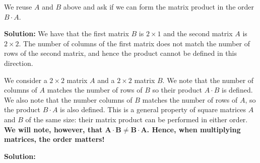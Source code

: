 \begin{example}
\label{ex:MatrixMultiplication02} 
 We reuse $A$ and $B$ above and ask if we can form the matrix product in the order $B \cdot A$.
\end{example}

\textbf{Solution:}
 We have that the first matrix $B$ is $2 \times 1$ and the second matrix $A$ is $2 \times 2$. The number of columns of the first matrix does not match the number of rows of the second matrix, and hence the product cannot be defined in this direction. \Qed\\

\begin{example}
\label{ex:MatrixMultiplication03} 
 We consider a $2 \times 2$ matrix $A$ and a $2 \times 2$ matrix $B$. We note that the number of columns of $A$ matches the number of rows of $B$ so their product $A\cdot B$ is defined. We also note that the number columns of $B$ matches the number of rows of $A$, so the product $B \cdot A$ is also defined. This is a general property of square matrices $A$ and $B$ of the same size: their matrix product can be performed in either order. \textbf{We will note, however, that $\mathbf{A \cdot B \neq B \cdot A}$. Hence, when multiplying matrices, the order matters! }
\end{example}

\textbf{Solution:} 

